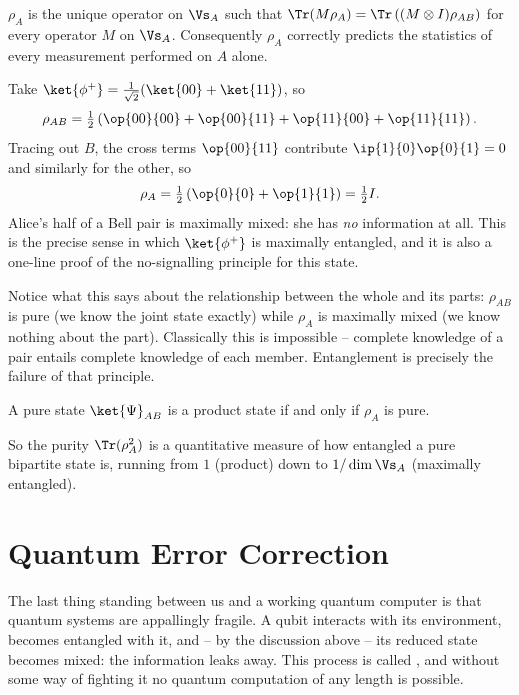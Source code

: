 \begin{proposition}
	$\rho_A$ is the unique operator on $\Vs_A$ such that $\Tr(M\rho_A) = \Tr\left((M\otimes I)\rho_{AB}\right)$ for every operator $M$ on $\Vs_A$. Consequently $\rho_A$ correctly predicts the statistics of every measurement performed on $A$ alone.
\end{proposition}

\begin{example}
	Take $\ket{\phi^+} = \tfrac1{\sqrt2}(\ket{00}+\ket{11})$, so
	$$\rho_{AB} = \tfrac12\left(\op{00}{00}+\op{00}{11}+\op{11}{00}+\op{11}{11}\right).$$
	Tracing out $B$, the cross terms $\op{00}{11}$ contribute $\ip{1}{0}\op{0}{1} = 0$ and similarly for the other, so
	$$\rho_A = \tfrac12\left(\op{0}{0}+\op{1}{1}\right) = \tfrac12I.$$
	Alice's half of a Bell pair is maximally mixed: she has \emph{no} information at all. This is the precise sense in which $\ket{\phi^+}$ is maximally entangled, and it is also a one-line proof of the no-signalling principle for this state.
\end{example}

Notice what this says about the relationship between the whole and its parts: $\rho_{AB}$ is pure (we know the joint state exactly) while $\rho_A$ is maximally mixed (we know nothing about the part). Classically this is impossible -- complete knowledge of a pair entails complete knowledge of each member. Entanglement is precisely the failure of that principle.

\begin{proposition}
	A pure state $\ket{\Psi}_{AB}$ is a product state if and only if $\rho_A$ is pure.
\end{proposition}

So the purity $\Tr(\rho_A^2)$ is a quantitative measure of how entangled a pure bipartite state is, running from $1$ (product) down to $1/\dim\Vs_A$ (maximally entangled).

\section{Quantum Error Correction}

The last thing standing between us and a working quantum computer is that quantum systems are appallingly fragile. A qubit interacts with its environment, becomes entangled with it, and -- by the discussion above -- its reduced state becomes mixed: the information leaks away. This process is called , and without some way of fighting it no quantum computation of any length is possible.

